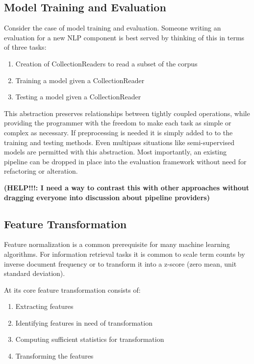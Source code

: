 \documentclass[10pt, a4paper]{article}
\begin{document}
\subsection{Model Training and Evaluation}
Consider the case of model training and evaluation.  Someone writing an evaluation for a new NLP component is best served by thinking of this in terms of three tasks:

\begin{enumerate}
\item Creation of CollectionReaders to read a subset of the corpus
\item Training a model given a CollectionReader
\item Testing a model given a CollectionReader
\end{enumerate}


This abstraction preserves relationships between tightly coupled operations, while providing the programmer with the freedom to make each task as simple or complex as necessary.  If preprocessing is needed it is simply added to to the training and testing methods.  Even multipass situations like semi-supervised models are permitted with this abstraction.  Most importantly, an existing pipeline can be dropped in place into the evaluation framework without need for refactoring or alteration.

\textbf{(HELP!!!: I need a way to contrast this with other approaches without dragging everyone into discussion about pipeline providers)}



\subsection{Feature Transformation}

Feature normalization is a common prerequisite for many machine learning algorithms.  For information retrieval tasks it is common to scale term counts by inverse document frequency or to transform it into a z-score (zero mean, unit standard deviation).

At its core feature transformation consists of:
\begin{enumerate}
\item Extracting features
\item Identifying features in need of transformation
\item Computing sufficient statistics for transformation
\item Transforming the features
\end{enumerate}
\end{document}
